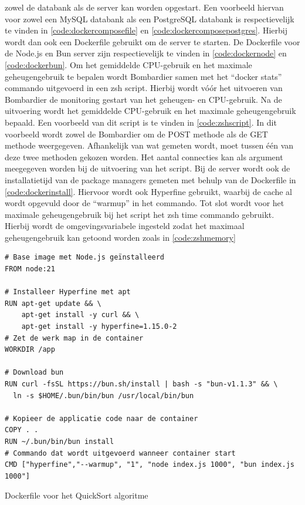 zowel de databank als de server kan worden opgestart. Een voorbeeld hiervan voor zowel een MySQL databank als een PostgreSQL databank is 
respectievelijk te vinden in \ref{code:dockercomposefile} en \ref{code:dockercomposepostgres}.
Hierbij wordt dan ook een Dockerfile gebruikt om de server te starten. De Dockerfile voor de Node.js en Bun server 
zijn respectievelijk te vinden in \ref{code:dockernode} en \ref{code:dockerbun}. 
Om het gemiddelde CPU-gebruik en het maximale geheugengebruik te bepalen wordt Bombardier samen met het “docker stats” commando uitgevoerd in een zsh script.
Hierbij wordt vóór het uitvoeren van Bombardier de monitoring gestart van het geheugen- en CPU-gebruik. 
Na de uitvoering wordt het gemiddelde CPU-gebruik en het maximale geheugengebruik bepaald.
Een voorbeeld van dit script is te vinden in \ref{code:zshscript}. 
In dit voorbeeld wordt zowel de Bombardier om de POST methode als de GET methode weergegeven. Afhankelijk van wat gemeten wordt, moet tussen één van deze twee methoden gekozen worden.
Het aantal connecties kan als argument meegegeven worden bij de uitvoering van het script.
Bij de server wordt ook de installatietijd van de package managers gemeten met behulp van de Dockerfile in \ref{code:dockerinstall}.
Hiervoor wordt ook Hyperfine gebruikt, waarbij de cache al wordt opgevuld door de “warmup” in het commando.
Tot slot wordt voor het maximale geheugengebruik bij het script het zsh time commando gebruikt. Hierbij wordt de omgevingsvariabele 
ingesteld zodat het maximaal geheugengebruik kan getoond worden zoals in \ref{code:zshmemory}
\begin{listing}[H]
  \centering
  \begin{verbatim}
# Base image met Node.js geïnstalleerd
FROM node:21

# Installeer Hyperfine met apt
RUN apt-get update && \
    apt-get install -y curl && \
    apt-get install -y hyperfine=1.15.0-2
# Zet de werk map in de container
WORKDIR /app

# Download bun
RUN curl -fsSL https://bun.sh/install | bash -s "bun-v1.1.3" && \
  ln -s $HOME/.bun/bin/bun /usr/local/bin/bun

# Kopieer de applicatie code naar de container
COPY . .
RUN ~/.bun/bin/bun install
# Commando dat wordt uitgevoerd wanneer container start
CMD ["hyperfine","--warmup", "1", "node index.js 1000", "bun index.js 1000"]
      \end{verbatim}
      \caption[Dockerfile QuickSort algoritme]{\label{code:dockerscript}Dockerfile voor het QuickSort algoritme}
\end{listing}
